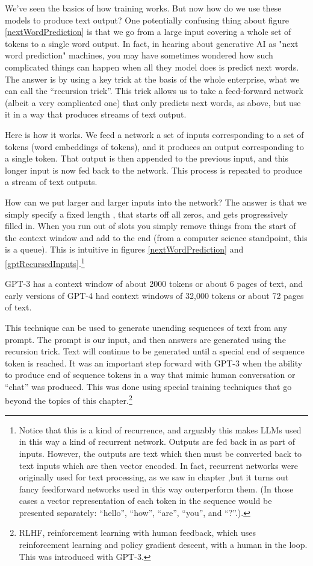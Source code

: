 We've seen the basics of how training works. But now how do we use these models to produce text output? One potentially confusing thing about figure \ref{nextWordPrediction} is that we go from a large input covering a whole set of tokens to a single word output. In fact, in hearing about generative AI as "next word prediction" machines, you may have sometimes wondered how such complicated things can happen when all they model does is predict next words. The answer is by using a key trick at the basis of the whole enterprise, what we can call the ``recursion trick''.  This trick allows us to take a feed-forward network (albeit a very complicated one) that only predicts next words, as above, but use it in a way that produces  streams of text output.

Here is how it works. We feed a network a set of inputs corresponding to a set of tokens (word embeddings of tokens), and it produces an output corresponding to a single token. That output is then appended to the previous input, and this longer input is now fed back to the network. This process is repeated to produce a stream of text outputs. 

How can we put larger and larger inputs into the network? The answer is that we simply specify a fixed length , that starts off all zeros, and gets progressively filled in. When you run out of slots you simply remove things from the start of the context window and add to the end (from a computer science standpoint, this is a queue). This is intuitive in figures \ref{nextWordPrediction} and \ref{gptRecursedInputs}.\footnote{Notice that this is a kind of recurrence, and arguably this makes LLMs used in this way a kind of recurrent network. Outputs are fed back in as part of inputs. However, the outputs are text which then must be converted back to text inputs which are then vector encoded.  In fact, recurrent networks were originally used for text processing, as we saw in chapter ,but it turns out fancy feedforward networks used in this way outerperform them.  (In those cases a vector representation of each token in the sequence would be presented separately: ``hello'', ``how'', ``are'', ``you'', and ``?''.).}

 GPT-3 has a context window of about 2000 tokens or about 6 pages of text, and early versions of GPT-4 had context windows of 32,000 tokens or about 72 pages of text.  

This technique can be used to generate unending sequences of text from any prompt. The prompt is our input, and then answers are generated using the recursion trick. Text will continue to be generated until a special end of sequence token is reached. It was an important step forward with GPT-3 when the ability to produce end of sequence tokens in a way that mimic human conversation or ``chat'' was produced. This was done using special training techniques that go beyond the topics of this chapter.\footnote{RLHF, reinforcement learning with human feedback, which uses reinforcement learning and policy gradient descent, with a human in the loop. This was introduced with GPT-3.} 


